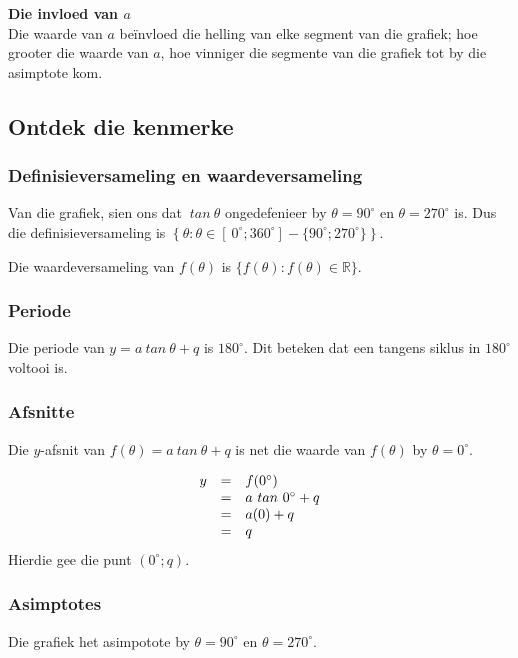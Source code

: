 \textbf{Die invloed van $a$}
\\
Die waarde van $a$ be\"invloed die helling van elke segment van die grafiek; hoe grooter die waarde van $a$, hoe vinniger die segmente van die grafiek tot by die asimptote kom. 





\subsection*{Ontdek die kenmerke}
\subsubsection*{Definisieversameling en waardeversameling}
\nopagebreak
Van die grafiek, sien ons dat $~tan~\theta$ ongedefenieer by $\theta = 90^{\circ}$ en $\theta = 270^{\circ}$ is. Dus die definisieversameling is
$\left\{ \theta: \theta \in [~0^{\circ}; 360^{\circ}] - \{90^{\circ}; 270^{\circ}\} \right\}$.

Die waardeversameling van $f(\theta)$ is $\{f(\theta): f(\theta) \in \mathbb{R}\}$.

\subsubsection*{Periode}
Die periode van $y=a~tan~\theta+q$ is $180^{\circ}$. Dit beteken dat een tangens siklus in $180^{\circ}$ voltooi is. 


\subsubsection*{Afsnitte}
\nopagebreak
Die $y$-afsnit van $f(\theta)=a~tan~\theta+q$ is net die waarde van $f(\theta)$ by $\theta = {0}^{\circ}$.

\begin{equation*}
\begin{array}{ccl}\hfill y& =& f({0}^{\circ })\hfill \\
 & =& a~tan~ {0}^{\circ } + q \hfill \\
 & =& a(0)+q\hfill \\
 & =& q\hfill 
\end{array}
\end{equation*}
Hierdie gee die punt $(0^{\circ}; q)$.
\subsubsection*{Asimptotes}
\nopagebreak
Die grafiek het asimpotote by $\theta ={90}^{\circ }$ en $\theta={270}^{\circ }$.

